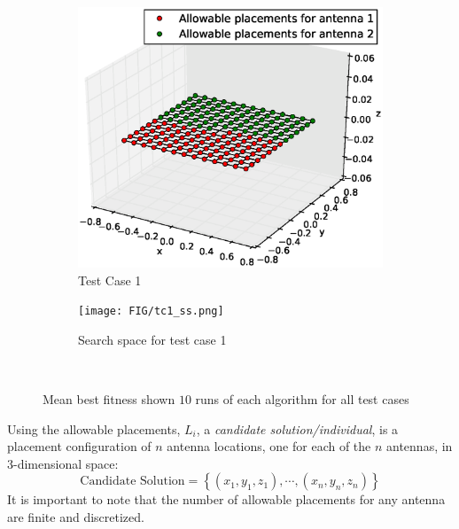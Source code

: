 \documentclass[conference]{IEEEtran}
\begin{document}
\begin{figure}%
    \centering
    \begin{subfigure}{\columnwidth}
        \includegraphics[width=\columnwidth]{FIG/tc_1_figure}%
        \caption{Test Case 1}%
    \label{fig:tc1_figure}%
    \end{subfigure}\hfill%
    \begin{subfigure}{\columnwidth}
        \texttt{[image: FIG/tc1\_ss.png]}%
        \caption{Search space for test case 1}%
        \label{fig:tc1_ss}%
    \end{subfigure}\hfill\\
    \caption{Mean best fitness shown $10$ runs of each algorithm for all test cases}
\end{figure}


%
Using the allowable placements, $L_i$, a \textit{candidate solution/individual}, is a placement configuration of $n$ antenna locations, one for each of the $n$ antennas, in 3-dimensional space:
\[
    \text{Candidate Solution}  = \left\{(x_1, y_1, z_1), \cdots, (x_n, y_n, z_n)\right\}
\]
It is important to note that the number of allowable placements for any antenna are finite and discretized. 
\end{document}
